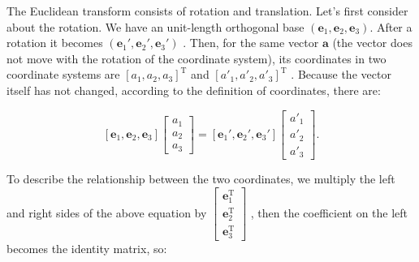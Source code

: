 The Euclidean transform consists of rotation and translation. Let's first consider about the rotation. We have an unit-length orthogonal base $ ( \mathbf {e}_ 1 , \mathbf {e}_ 2 , \mathbf {e}_ 3 ) $. After a rotation it becomes $ ( \mathbf {e}_ 1 ' , \mathbf {e}_ 2 ', \mathbf {e}_ 3 ') $ . Then, for the same vector $ \mathbf {a} $ (the vector does not move with the rotation of the coordinate system), its coordinates in two coordinate systems are $ [a_ 1 , a_ 2 , a_ 3 ] ^ \mathrm {T} $ and $[a'_ 1 , a'_ 2 , a'_ 3 ]^ \mathrm {T} $ . Because the vector itself has not changed, according to the definition of coordinates, there are:

\begin{equation}
\left[ \mathbf{e}_1,\mathbf{e}_2,\mathbf{e}_3 \right]\left[ \begin{array}{l}
{a_1}\\
{a_2}\\
{a_3}
\end{array} \right] = \left[ \mathbf{e}_1', \mathbf{e}_2', \mathbf{e}_3' \right]\left[ \begin{array}{l}
a'_1\\
a'_2\\
a'_3
\end{array} \right].
\end{equation}

To describe the relationship between the two coordinates, we multiply the left and right sides of the above equation by $ \left [ \begin {array}{l}
\mathbf{e}_1^\mathrm{T}\\
\mathbf{e}_2^\mathrm{T}\\
\mathbf{e}_3^\mathrm{T}
\end {array} \right ] $ , then the coefficient on the left becomes the identity matrix, so:

